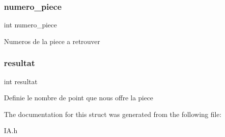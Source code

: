 \subsubsection{\texorpdfstring{numero\+\_\+piece}{numero\_piece}}
{\footnotesize\ttfamily int numero\+\_\+piece}

Numeros de la piece a retrouver \mbox{\label{structt__retour_a8afc85cb27005e2bd7dfc73222b85a46}} 
\subsubsection{\texorpdfstring{resultat}{resultat}}
{\footnotesize\ttfamily int resultat}

Definie le nombre de point que nous offre la piece 

The documentation for this struct was generated from the following file\+:\begin{DoxyCompactItemize}
\item 
I\+A.\+h\end{DoxyCompactItemize}
